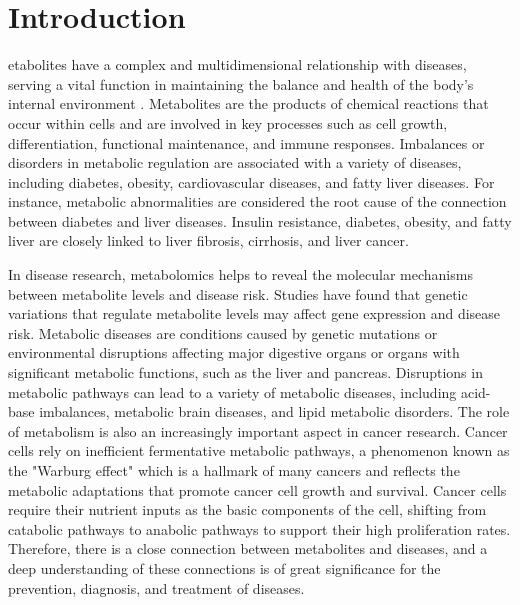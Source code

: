 \documentclass[lettersize,journal]{IEEEtran}
\begin{document}
\section{\textbf{Introduction}}\label{sec1}
etabolites have a complex and multidimensional relationship with diseases, serving a vital function in maintaining the balance and health of the body's internal environment \cite{transport1}. Metabolites are the products of chemical reactions that occur within cells and are involved in key processes such as cell growth, differentiation, functional maintenance, and immune responses. Imbalances or disorders in metabolic regulation are associated with a variety of diseases, including diabetes\cite{dhanya2016salivary}, obesity\cite{drucker2021diabetes}, cardiovascular\cite{amiri2022role} diseases, and fatty liver diseases. For instance, metabolic abnormalities are considered the root cause of the connection between diabetes and liver diseases. Insulin resistance\cite{lee2022insulin}, diabetes, obesity, and fatty liver are closely linked to liver fibrosis, cirrhosis, and liver cancer\cite{liu2021transition, dhar2020mechanisms}.

In disease research, metabolomics helps to reveal the molecular mechanisms between metabolite levels and disease risk\cite{chen2022guide}. Studies have found that genetic variations that regulate metabolite levels may affect gene expression and disease risk. Metabolic diseases are conditions caused\cite{hoffman2021developmental} by genetic mutations or environmental disruptions affecting major digestive organs or organs with significant metabolic functions, such as the liver and pancreas. Disruptions in metabolic pathways can lead to a variety of metabolic diseases, including acid-base imbalances, metabolic brain diseases\cite{jensen2020effects}, and lipid metabolic disorders\cite{aron2021metabolism}. The role of metabolism is also an increasingly important aspect in cancer research. Cancer cells rely on inefficient fermentative metabolic pathways, a phenomenon known as the "Warburg effect"\cite{vaupel2021revisiting} which is a hallmark of many cancers and reflects the metabolic adaptations that promote cancer cell growth and survival. Cancer cells require their nutrient inputs as the basic components of the cell, shifting from catabolic pathways to anabolic pathways to support their high proliferation rates\cite{martinez2021cancer}. Therefore, there is a close connection between metabolites and diseases, and a deep understanding of these connections is of great significance for the prevention, diagnosis, and treatment of diseases.
\end{document}
